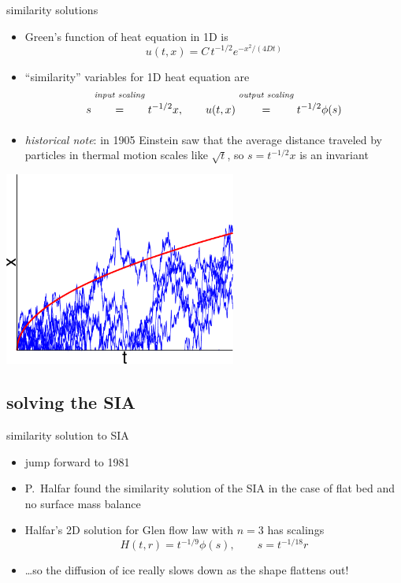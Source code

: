 \documentclass[titlepage,letterpaper,final,11pt]{scrartcl}
\begin{document}
similarity solutions

\begin{itemize}
\item Green's function of heat equation in 1D is
	$$u(t,x) = C\, t^{-1/2} e^{-x^2/(4Dt)}$$
\item ``similarity'' variables for 1D heat equation are
	$$s \stackrel{\text{\emph{input scaling}}}{\phantom{\Big|}=\phantom{\Big|}} t^{-1/2} x, \qquad u(t,x) \stackrel{\text{\emph{output scaling}}}{\phantom{\Big|}=\phantom{\Big|}} t^{-1/2} \phi(s)$$
\end{itemize}

\begin{itemize}
\item \emph{historical note}:  in 1905 Einstein saw that the average distance traveled by particles in thermal motion scales like $\sqrt{t}$, so $s = t^{-1/2}x$ is an invariant
\end{itemize}

\begin{center}
\includegraphics[width=3.0in]{brownian}
\end{center}

\subsection{solving the SIA}

similarity solution to SIA

\begin{itemize}
\item jump forward to 1981
\item P.~Halfar found the similarity solution of the SIA in the case of flat bed and no surface mass balance \nocite{Halfar81,Halfar83}
\item Halfar's 2D solution for Glen flow law with $n=3$ has scalings
   $$H(t,r)=t^{-1/9} \phi(s), \qquad s = t^{-1/18} r$$
\item \dots so the diffusion of ice really slows down as the shape flattens out!
\end{itemize}
\end{document}
